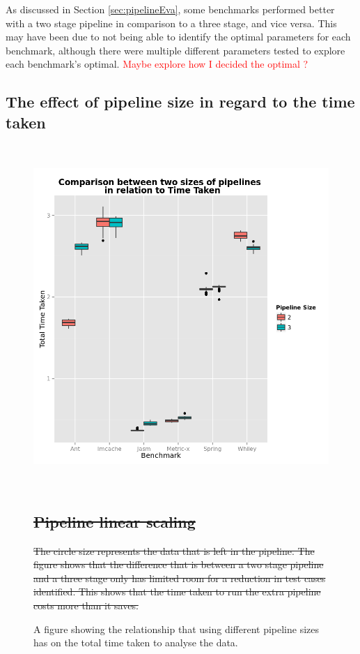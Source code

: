 \documentclass[11pt
              , a4paper
              , twoside
              , openright
              ]{report}
\newcommand\todo[1]{\textcolor{red}{#1}}
\providecommand{\DIFdel}[1]{{\protect\color{red}\sout{#1}}}                      %
\providecommand{\DIFdelFL}[1]{\DIFdel{#1}} %
\providecommand{\DIFdelbeginFL}{} %
\providecommand{\DIFdelendFL}{} %
\begin{document}
As discussed in Section \ref{sec:pipelineEva}, some benchmarks performed better with a two stage pipeline in comparison to a three stage, and vice versa. This may have been due to not being able to identify the optimal parameters for each benchmark, although there were multiple different parameters tested to explore each benchmark's optimal. \todo{Maybe explore how I decided the optimal ?} \newpage 
 \newpage \begin{appendices}
\chapter{The effect of pipeline size in regard to the time taken}
\begin{figure}[h]
\centering
\includegraphics[width=\textwidth,height=13cm]{PipelineTime.png}
\caption{A figure showing the relationship that using different pipeline sizes has on the total time taken to analyse the data.}
\label{fig:pipelinetime}
\DIFdelbeginFL %

\chapter{\DIFdelFL{Pipeline linear scaling}}
\addtocounter{chapter}{-1}%
{%
\DIFdelFL{The circle size represents the data that is left in the pipeline. The figure shows that the difference that is between a two stage pipeline and a three stage only has limited room for a reduction in test cases identified. This shows that the time taken to run the extra pipeline costs more than it saves.}}
\DIFdelendFL \end{figure}


\end{appendices}
\end{document}
